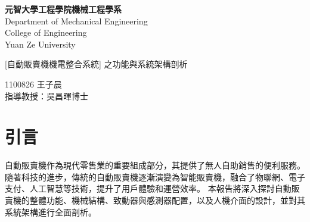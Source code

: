 \documentclass[12pt]{article}       %
\begin{document}
\begin{titlepage}
    \centering
    \vspace*{1cm} %

    {\LARGE \textbf{元智大學工程學院機械工程學系}} \\[0.5cm] %
    {\LARGE {Department of Mechanical Engineering}} \\[0.5cm] %
    {\LARGE {College of Engineering}} \\[0.5cm]
    {\LARGE {Yuan Ze University}}

    \vfill %

    {\LARGE{[自動販賣機機電整合系統] 之功能與系統架構剖析}} %

    \vfill %

    {\LARGE {1100826 王子晨}}\\[4.5cm]
    {\LARGE {指導教授：吳昌暉\hspace{0.5cm}博士}}\\[0.5cm]

\end{titlepage}
\newpage
{}  
\setcounter{page}{1}  %


\begin{center}
    \tableofcontents    %

\end{center}

\newpage  %
\setcounter{page}{1}  %

\section{\centering 引言}
\hspace{2em}自動販賣機作為現代零售業的重要組成部分，其提供了無人自助銷售的便利服務。
隨著科技的進步，傳統的自動販賣機逐漸演變為智能販賣機，融合了物聯網、電子支付、人工智慧等技術，提升了用戶體驗和運營效率。
本報告將深入探討自動販賣機的整體功能、機械結構、致動器與感測器配置，以及人機介面的設計，並對其系統架構進行全面剖析。
\end{document}
